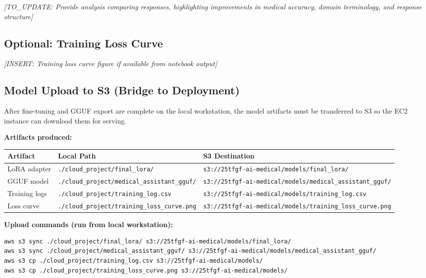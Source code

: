 \documentclass[11pt,a4paper]{article}
\begin{document}
\textit{[TO\_UPDATE: Provide analysis comparing responses, highlighting improvements in medical accuracy, domain terminology, and response structure]}

\subsection{Optional: Training Loss Curve}

\textit{[INSERT: Training loss curve figure if available from notebook output]}

\subsection{Model Upload to S3 (Bridge to Deployment)}

After fine-tuning and GGUF export are complete on the local workstation, the model artifacts must be transferred to S3 so the EC2 instance can download them for serving.

\textbf{Artifacts produced:}
\begin{table}[H]
\centering
\begin{tabular}{@{}lll@{}}
\toprule
\textbf{Artifact} & \textbf{Local Path} & \textbf{S3 Destination} \\
\midrule
LoRA adapter & \texttt{./cloud\_project/final\_lora/} & \texttt{s3://25tfgf-ai-medical/models/final\_lora/} \\
GGUF model & \texttt{./cloud\_project/medical\_assistant\_gguf/} & \texttt{s3://25tfgf-ai-medical/models/medical\_assistant\_gguf/} \\
Training logs & \texttt{./cloud\_project/training\_log.csv} & \texttt{s3://25tfgf-ai-medical/models/training\_log.csv} \\
Loss curve & \texttt{./cloud\_project/training\_loss\_curve.png} & \texttt{s3://25tfgf-ai-medical/models/training\_loss\_curve.png} \\
\bottomrule
\end{tabular}
\end{table}

\textbf{Upload commands (run from local workstation):}
\begin{lstlisting}[style=bash]
aws s3 sync ./cloud_project/final_lora/ s3://25tfgf-ai-medical/models/final_lora/
aws s3 sync ./cloud_project/medical_assistant_gguf/ s3://25tfgf-ai-medical/models/medical_assistant_gguf/
aws s3 cp ./cloud_project/training_log.csv s3://25tfgf-ai-medical/models/
aws s3 cp ./cloud_project/training_loss_curve.png s3://25tfgf-ai-medical/models/
\end{lstlisting}
\end{document}
